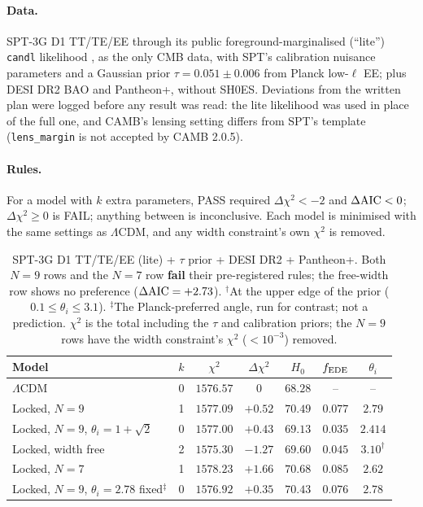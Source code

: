 \documentclass[11pt]{article}
\newcommand{\SPTfreeDchi}{\ensuremath{-1.27}}   %
\newcommand{\SPTfreeHz}{\ensuremath{69.60}}     %
\newcommand{\SPTfreeF}{\ensuremath{0.045}}      %
\newcommand{\SPTfreeVerdict}{no preference ($\Delta{\rm AIC}=+2.73$)}
\newcommand{\SPTsevenDchi}{\ensuremath{+1.66}}  %
\begin{document}
\paragraph{Data.} SPT-3G D1 TT/TE/EE \cite{camphuis2025} through its public foreground-marginalised
(``lite'') \texttt{candl} likelihood \cite{balkenhol2024}, as the only CMB data, with SPT's calibration
nuisance parameters and a Gaussian prior $\tau=0.051\pm0.006$ from Planck low-$\ell$ EE; plus DESI DR2
BAO and Pantheon+, without SH0ES. Deviations from the written plan were logged before any result was
read: the lite likelihood was used in place of the full one, and CAMB's lensing setting differs from
SPT's template (\texttt{lens\_margin} is not accepted by CAMB 2.0.5).

\paragraph{Rules.} For a model with $k$ extra parameters, PASS required $\Delta\chi^2<-2$ and
$\Delta{\rm AIC}<0$; $\Delta\chi^2\ge0$ is FAIL; anything between is inconclusive. Each model is
minimised with the same settings as $\Lambda$CDM, and any width constraint's own $\chi^2$ is removed.

\begin{table}[h]
\centering
\small
\begin{tabular}{lcccccc}
\toprule
Model & $k$ & $\chi^2$ & $\Delta\chi^2$ & $H_0$ & $f_{\rm EDE}$ & $\theta_i$\\
\midrule
$\Lambda$CDM & 0 & $1576.57$ & $0$ & $68.28$ & -- & --\\
Locked, $N=9$ & 1 & $1577.09$ & $+0.52$ & $70.49$ & $0.077$ & $2.79$\\
Locked, $N=9$, $\theta_i=1+\sqrt2$ & 0 & $1577.00$ & $+0.43$ & $69.13$ & $0.035$ & $2.414$\\
Locked, width free & 2 & $1575.30$ & \SPTfreeDchi & \SPTfreeHz & \SPTfreeF & $3.10^\dagger$\\
Locked, $N=7$ & 1 & $1578.23$ & \SPTsevenDchi & $70.68$ & $0.085$ & $2.62$\\
Locked, $N=9$, $\theta_i=2.78$ fixed$^\ddagger$ & 0 & $1576.92$ & $+0.35$ & $70.43$ & $0.076$ & $2.78$\\
\bottomrule
\end{tabular}
\caption{SPT-3G D1 TT/TE/EE (lite) + $\tau$ prior + DESI DR2 + Pantheon+. Both $N=9$ rows
and the $N=7$ row \textbf{fail} their pre-registered rules; the free-width row shows \SPTfreeVerdict.
$^\dagger$At the upper edge of the prior ($0.1\le\theta_i\le3.1$). $^\ddagger$The Planck-preferred angle, run for
contrast; not a prediction. $\chi^2$ is the total
including the $\tau$ and calibration priors; the $N=9$ rows have the width constraint's $\chi^2$
($<10^{-3}$) removed.}
\label{tab:spt}
\end{table}
\end{document}
